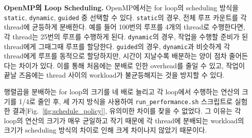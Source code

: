 \begin{itemize}
{        \textbf{OpenMP의 Loop Scheduling.}
        OpenMP에서는 for loop의 scheduling 방식을 \texttt{static}, \texttt{dynamic}, \texttt{guided}
        중 선택할 수 있다.
        \texttt{static}의 경우, 전체 루프 카운트를 각 thread에 균등하게 분배한다.
        예를 들어 100번의 루프를 4개의 thread로 수행한다면, 각 thread는 25번의 루프를 수행하게 된다.
        \texttt{dynamic}의 경우, 작업을 수행할 준비가 된 thread에게 그때그때 루프를 할당한다.
        \texttt{guided}의 경우, \texttt{dynamic}과 비슷하게 각 thread에게 루프를 동적으로 할당하지만,
        시간이 지날수록 배분하는 양이 점차 줄어든다는 차이가 있다.
        이를 통해 처음에는 분배로 인한 overhead를 줄일 수 있고,
        작업이 끝날 즈음에는 thread 사이의 workload가 불균등해지는 것을 방지할 수 있다.

        행렬곱을 분배하는 for loop의 크기를 네 배로 늘리고 각 loop에서 수행하는 연산의 크기를 1/4로 줄인 후,
        세 가지 방식을 사용하여 \texttt{run\_performance.sh} 스크립트로 실험한 결과[Fig.~\ref{fig:schedule_policy}],
        유의미한 차이를 찾을 수 없었다. 그 이유는 각 loop의 연산의 크기가 매우 균일하고 작기 때문에
        각 thread에 분배되는 workload의 크기가 scheduling 방식의 차이로 인해 크게 차이나지 않았기 때문이다.
    }
    
\end{itemize}